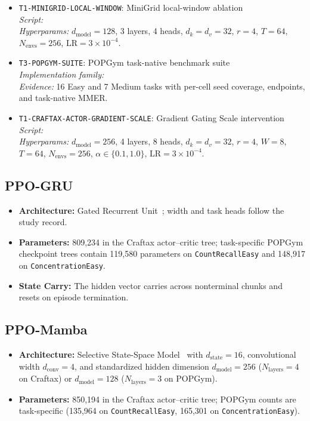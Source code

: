 \begin{itemize}
    \item \texttt{T1-MINIGRID-LOCAL-WINDOW}: MiniGrid local-window ablation \\
    \textit{Script:}  \\
    \textit{Hyperparams:} $d_{\text{model}}=128$, 3 layers, 4 heads, $d_k=d_v=32$, $r=4$, $T=64$, $N_{\text{envs}}=256$, $\text{LR}=3\times10^{-4}$.
    
    \item \texttt{T3-POPGYM-SUITE}: POPGym task-native benchmark suite \\
    \textit{Implementation family:}  \\
    \textit{Evidence:} 16 Easy and 7 Medium tasks with per-cell seed coverage, endpoints, and task-native MMER.
    
    \item \texttt{T1-CRAFTAX-ACTOR-GRADIENT-SCALE}: Gradient Gating Scale intervention \\
    \textit{Script:}  \\
    \textit{Hyperparams:} $d_{\text{model}}=256$, 4 layers, 8 heads, $d_k=d_v=32$, $r=4$, $W=8$, $T=64$, $N_{\text{envs}}=256$, $\alpha\in\{0.1,1.0\}$, $\text{LR}=3\times10^{-4}$.
\end{itemize}

\subsection{PPO-GRU}
\begin{itemize}
    \item \textbf{Architecture:} Gated Recurrent Unit~\cite{cho2014learning}; width and task heads follow the study record.
    \item \textbf{Parameters:} 809,234 in the Craftax actor--critic tree; task-specific POPGym checkpoint trees contain 119,580 parameters on \texttt{CountRecallEasy} and 148,917 on \texttt{ConcentrationEasy}.
    \item \textbf{State Carry:} The hidden vector carries across nonterminal chunks and resets on episode termination.
\end{itemize}

\subsection{PPO-Mamba}
\begin{itemize}
    \item \textbf{Architecture:} Selective State-Space Model~\cite{gu2023mamba} with $d_{\text{state}}=16$, convolutional width $d_{\text{conv}}=4$, and standardized hidden dimension $d_{\text{model}}=256$ ($N_{\text{layers}}=4$ on Craftax) or $d_{\text{model}}=128$ ($N_{\text{layers}}=3$ on POPGym).
    \item \textbf{Parameters:} 850,194 in the Craftax actor--critic tree; POPGym counts are task-specific (135,964 on \texttt{CountRecallEasy}, 165,301 on \texttt{ConcentrationEasy}).
\end{itemize}

